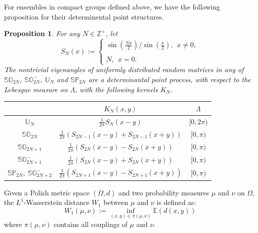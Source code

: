 \documentclass[11pt]{article}
\newtheorem{proposition}[theorem]{Proposition}
\numberwithin{equation}{section}%
\numberwithin{theorem}{section}
\begin{document}
For ensembles in compact groups defined above, we have the following proposition for their determinental point structures.
\begin{proposition}\label{kernel}
    {\rm\cite[Proposition $3.9$]{meckes_random_2019}} For any $N\in\mathbb{Z}^+$, let
    \begin{equation*}
        S_N(x):=\left\{\begin{array}{cl}
        \sin\left(\frac{Nx}{2}\right)/\sin\left(\frac{x}{2}\right),~~x\ne0,\\
        \\
        N,~~x=0.
        \end{array}\right.
    \end{equation*}
The nontrivial eigenangles of uniformly distributed random matrices in any of $\mathbb{SO}_{2N},~\mathbb{SO}^-_{2N},~\mathbb{U}_N$ and $\mathbb{SP}_{2N}$ are a determinantal point process, with respect to the Lebesgue measure on $\Lambda$, with the following kernels $K_N$.
\begin{center}
\begin{tabular}{c c c } 
 \hline
  & $K_N(x,y)$ & $\Lambda$ \\[0.5ex] \hline
 $\mathbb{U}_N$ & $\frac{1}{2\pi}S_N(x-y)$ & $[0,2\pi)$  \\[1ex] 
 \hline
 $\mathbb{SO}_{2N}$ & $\frac{1}{2\pi}\left(S_{2N-1}(x-y)+S_{2N-1}(x+y)\right)$ & $[0,\pi)$   \\[1ex]
 \hline
 $\mathbb{SO}_{2N+1}$ &$\frac{1}{2\pi}\left(S_{2N}(x-y)-S_{2N}(x+y)\right)$ & $[0,\pi)$   \\[1ex]
 \hline
 $\mathbb{SO}^-_{2N+1}$ &$\frac{1}{2\pi}\left(S_{2N}(x-y)+S_{2N}(x+y)\right)$ & $[0,\pi)$   \\[1ex]
 \hline
 $\mathbb{SP}_{2N},~\mathbb{SO}^-_{2N+2}$ & $\frac{1}{2\pi}\left(S_{2N+1}(x-y)-S_{2N+1}(x+y)\right)$ & $[0,\pi)$   \\[1ex]
 \hline
\end{tabular}
\end{center}
\end{proposition}
\bigskip

Given a Polish metric space $(\Omega,d)$ and two probability measures $\mu$ and $\nu$ on $\Omega$, the $L^1$-Wasserstein distance $W_1$ between $\mu$ and $\nu$ is defined as:
\begin{equation*}
    W_1(\mu,\nu):=\inf_{(x,y)\in\pi(\mu,\nu)}\mathbb{E}\left(d(x,y)\right)
\end{equation*}
where $\pi(\mu,\nu)$ contains all couplings of $\mu$ and $\nu$.
\end{document}
